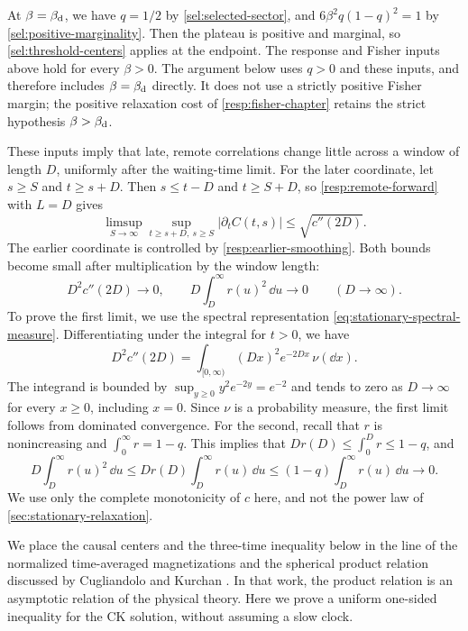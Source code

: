 At $\beta=\beta_{\mathrm d}$, we have $q=1/2$ by \cref{sel:selected-sector}, and $6\beta^2q(1-q)^2=1$ by \cref{sel:positive-marginality}. Then the plateau is positive and marginal, so \cref{sel:threshold-centers} applies at the endpoint. The response and Fisher inputs above hold for every $\beta>0$. The argument below uses $q>0$ and these inputs, and therefore includes $\beta=\beta_{\mathrm d}$ directly. It does not use a strictly positive Fisher margin; the positive relaxation cost of \cref{resp:fisher-chapter} retains the strict hypothesis $\beta>\beta_{\mathrm d}$.

These inputs imply that late, remote correlations change little across a window of length $D$, uniformly after the waiting-time limit. For the later coordinate, let $s\ge S$ and $t\ge s+D$. Then $s\le t-D$ and $t\ge S+D$, so \eqref{resp:remote-forward} with $L=D$ gives
\begin{equation}
 \limsup_{S\to\infty}\sup_{t\ge s+D,\ s\ge S}|\partial_tC(t,s)|\le\sqrt{c''(2D)} .
 \label{eq:geometry-remote-derivative-input}
\end{equation}
The earlier coordinate is controlled by \eqref{resp:earlier-smoothing}. Both bounds become small after multiplication by the window length:
\begin{equation}
 D^2c''(2D)\longrightarrow0,\qquad D\int_D^\infty r(u)^2\,\dd u\longrightarrow0\qquad(D\to\infty).
 \label{eq:geometry-smoothing-moduli}
\end{equation}
To prove the first limit, we use the spectral representation \eqref{eq:stationary-spectral-measure}. Differentiating under the integral for $t>0$, we have
\[
 D^2c''(2D)=\int_{[0,\infty)}(Dx)^2e^{-2Dx}\,\nu(\dd x).
\]
The integrand is bounded by $\sup_{y\ge0}y^2e^{-2y}=e^{-2}$ and tends to zero as $D\to\infty$ for every $x\ge0$, including $x=0$. Since $\nu$ is a probability measure, the first limit follows from dominated convergence. For the second, recall that $r$ is nonincreasing and $\int_0^\infty r=1-q$. This implies that $Dr(D)\le\int_0^Dr\le1-q$, and
\[
 D\int_D^\infty r(u)^2\,\dd u\le Dr(D)\int_D^\infty r(u)\,\dd u\le(1-q)\int_D^\infty r(u)\,\dd u\longrightarrow0 .
\]
We use only the complete monotonicity of $c$ here, and not the power law of \cref{sec:stationary-relaxation}.

We place the causal centers and the three-time inequality below in the line of the normalized time-averaged magnetizations and the spherical product relation discussed by Cugliandolo and Kurchan \cite[arXiv version~1, Section~5.1, Equations~(5.1.8)--(5.1.9)]{ck1994}. In that work, the product relation is an asymptotic relation of the physical theory. Here we prove a uniform one-sided inequality for the CK solution, without assuming a slow clock.

